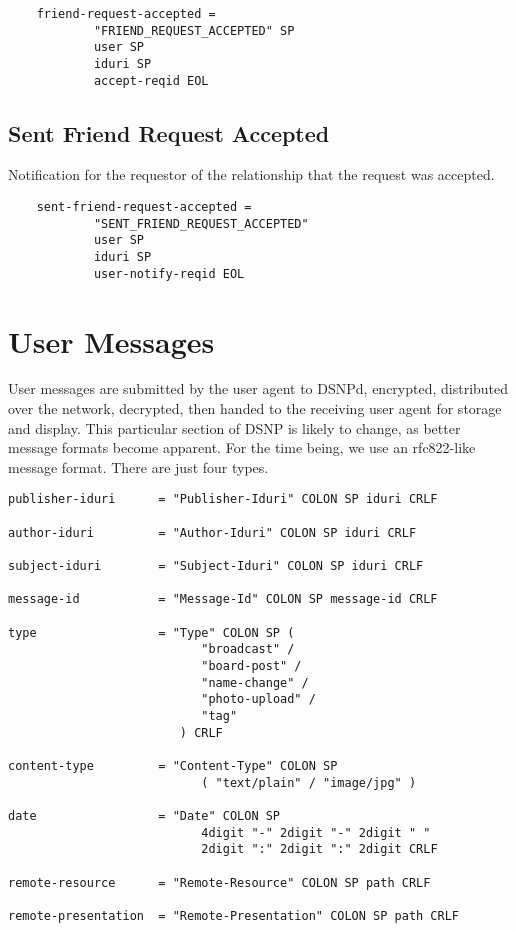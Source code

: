 \documentclass[letterpaper,11pt,oneside]{article}
\begin{document}
\vspace{10pt}
\begin{verbatim}
    friend-request-accepted =
            "FRIEND_REQUEST_ACCEPTED" SP
            user SP
            iduri SP
            accept-reqid EOL
\end{verbatim}
\vspace{10pt}

\subsection{Sent Friend Request Accepted}

Notification for the requestor of the relationship that the request was
accepted.

\vspace{10pt}
\begin{verbatim}
    sent-friend-request-accepted =
            "SENT_FRIEND_REQUEST_ACCEPTED"
            user SP
            iduri SP
            user-notify-reqid EOL
\end{verbatim}
\vspace{10pt}

\section{User Messages}

User messages are submitted by the user agent to DSNPd, encrypted, distributed
over the network, decrypted, then handed to the receiving user agent for
storage and display. This particular section of DSNP is likely to change, as
better message formats become apparent. For the time being, we use an
rfc822-like message format. There are just four types.

\begin{verbatim}
publisher-iduri      = "Publisher-Iduri" COLON SP iduri CRLF

author-iduri         = "Author-Iduri" COLON SP iduri CRLF

subject-iduri        = "Subject-Iduri" COLON SP iduri CRLF

message-id           = "Message-Id" COLON SP message-id CRLF

type                 = "Type" COLON SP (
                           "broadcast" /
                           "board-post" /
                           "name-change" /
                           "photo-upload" /
                           "tag"
                        ) CRLF

content-type         = "Content-Type" COLON SP
                           ( "text/plain" / "image/jpg" )

date                 = "Date" COLON SP
                           4digit "-" 2digit "-" 2digit " " 
                           2digit ":" 2digit ":" 2digit CRLF

remote-resource      = "Remote-Resource" COLON SP path CRLF

remote-presentation  = "Remote-Presentation" COLON SP path CRLF
\end{verbatim}
\end{document}
